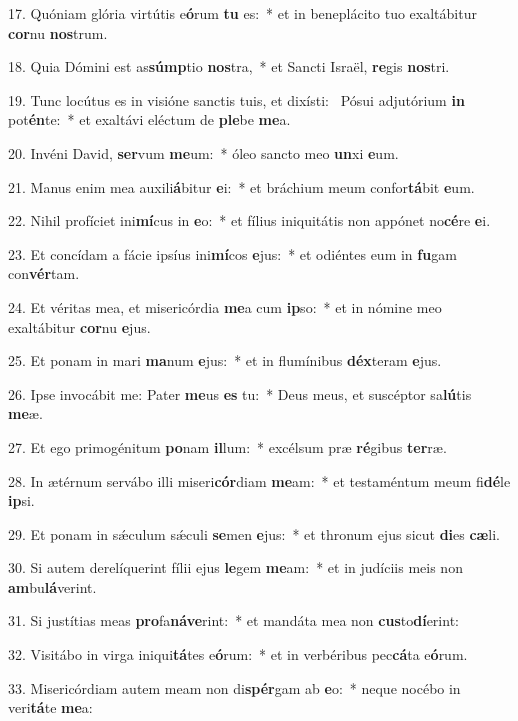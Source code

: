 17. Quóniam glória virtútis e\textbf{ó}rum \textbf{tu} es:~*  et in beneplácito tuo exaltábitur \textbf{cor}nu \textbf{nos}trum.\

18. Quia Dómini est as\textbf{súmp}tio \textbf{nos}tra,~*  et Sancti Israël, \textbf{re}gis \textbf{nos}tri.\

19. Tunc locútus es in visióne sanctis tuis, et dixísti: \dag\  Pósui adjutórium \textbf{in} pot\textbf{én}te:~*  et exaltávi eléctum de \textbf{ple}be \textbf{me}a.\

20. Invéni David, \textbf{ser}vum \textbf{me}um:~*  óleo sancto meo \textbf{un}xi \textbf{e}um.\

21. Manus enim mea auxili\textbf{á}bitur \textbf{e}i:~*  et bráchium meum confor\textbf{tá}bit \textbf{e}um.\

22. Nihil profíciet ini\textbf{mí}cus in \textbf{e}o:~*  et fílius iniquitátis non appónet no\textbf{cé}re \textbf{e}i.\

23. Et concídam a fácie ipsíus ini\textbf{mí}cos \textbf{e}jus:~*  et odiéntes eum in \textbf{fu}gam con\textbf{vér}tam.\

24. Et véritas mea, et misericórdia \textbf{me}a cum \textbf{ip}so:~*  et in nómine meo exaltábitur \textbf{cor}nu \textbf{e}jus.\

25. Et ponam in mari \textbf{ma}num \textbf{e}jus:~*  et in flumínibus \textbf{déx}teram \textbf{e}jus.\

26. Ipse invocábit me: Pater \textbf{me}us \textbf{es} tu:~*  Deus meus, et suscéptor sa\textbf{lú}tis \textbf{me}æ.\

27. Et ego primogénitum \textbf{po}nam \textbf{il}lum:~*  excélsum præ \textbf{ré}gibus \textbf{ter}ræ.\

28. In ætérnum servábo illi miseri\textbf{cór}diam \textbf{me}am:~*  et testaméntum meum fi\textbf{dé}le \textbf{ip}si.\

29. Et ponam in sǽculum sǽculi \textbf{se}men \textbf{e}jus:~*  et thronum ejus sicut \textbf{di}es \textbf{cæ}li.\

30. Si autem derelíquerint fílii ejus \textbf{le}gem \textbf{me}am:~*  et in judíciis meis non \textbf{am}bu\textbf{lá}verint.\

31. Si justítias meas \textbf{pro}fa\textbf{ná}\textbf{ve}rint:~*  et mandáta mea non \textbf{cus}to\textbf{dí}erint:\

32. Visitábo in virga iniqui\textbf{tá}tes e\textbf{ó}rum:~*  et in verbéribus pec\textbf{cá}ta e\textbf{ó}rum.\

33. Misericórdiam autem meam non di\textbf{spér}gam ab \textbf{e}o:~*  neque nocébo in veri\textbf{tá}te \textbf{me}a:\

